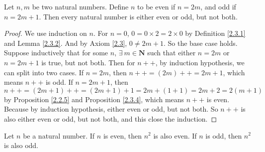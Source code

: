 \begin{additional corollary}\label{ac 4.4.1}
Let \(n, m\) be two natural numbers.
Define \(n\) to be even if \(n = 2m\), and odd if \(n = 2m + 1\).
Then every natural number is either even or odd, but not both.
\end{additional corollary}

\begin{proof}
We use induction on \(n\).
For \(n = 0\), \(0 = 0 \times 2 = 2 \times 0\) by Definition \ref{2.3.1} and Lemma \ref{2.3.2}.
And by Axiom \ref{2.3}, \(0 \neq 2m + 1\).
So the base case holds.
Suppose inductively that for some \(n\), \(\exists\ m \in \mathbf{N}\) such that either \(n = 2m\) or \(n = 2m + 1\) is true, but not both.
Then for \(n++\), by induction hypothesis, we can split into two cases.
If \(n = 2m\), then \(n++ = (2m)++ = 2m + 1\), which means \(n++\) is odd.
If \(n = 2m + 1\), then \(n++ = (2m + 1)++ = (2m + 1) + 1 = 2m + (1 + 1) = 2m + 2 = 2(m + 1)\) by Proposition \ref{2.2.5} and Proposition \ref{2.3.4}, which means \(n++\) is even.
Because by induction hypothesis, either even or odd, but not both.
So \(n++\) is also either even or odd, but not both, and this close the induction.
\end{proof}

\begin{additional corollary}\label{ac 4.4.2}
Let \(n\) be a natural number.
If \(n\) is even, then \(n^2\) is also even.
If \(n\) is odd, then \(n^2\) is also odd.
\end{additional corollary}


